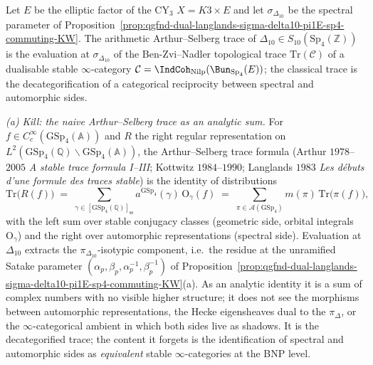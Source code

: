 \begin{proposition}
\label{prop:qgfnd-categorified-arthur-selberg-BZN-topological-trace-delta10}
Let $E$ be the elliptic factor of the CY$_3$ $X=K3\times E$ and let
$\sigma_{\Delta_{10}}$ be the spectral parameter of
Proposition~\ref{prop:qgfnd-dual-langlands-sigma-delta10-pi1E-sp4-commuting-KW}.
The arithmetic Arthur--Selberg trace of $\Delta_{10}\in S_{10}(\mathrm{Sp}_4(\mathbb Z))$
is the evaluation at $\sigma_{\Delta_{10}}$ of the Ben-Zvi--Nadler
topological trace $\mathrm{Tr}(\mathcal C)$ of a dualisable stable
$\infty$-category $\mathcal C=\IndCoh_{\mathrm{Nilp}}(\Bun_{\mathrm{Sp}_4}(E))$;
the classical trace is the decategorification of a categorical
reciprocity between spectral and automorphic sides.

\emph{(a) Kill: the naive Arthur--Selberg trace as an analytic sum.}
For $f\in C_c^{\infty}(\mathrm{GSp}_4(\mathbb A))$ and
$R$ the right regular representation on
$L^2(\mathrm{GSp}_4(\mathbb Q)\backslash\mathrm{GSp}_4(\mathbb A))$,
the Arthur--Selberg trace formula (Arthur $1978$--$2005$
\emph{A stable trace formula I--III}; Kottwitz $1984$--$1990$; Langlands
$1983$ \emph{Les d\'ebuts d'une formule des traces stable}) is the
identity of distributions
\[
 \mathrm{Tr}\bigl(R(f)\bigr)
 \;=\;\sum_{\gamma\in[\mathrm{GSp}_4(\mathbb Q)]_{\mathrm{ss}}}
 a^{\mathrm{GSp}_4}(\gamma)\,\mathrm{O}_\gamma(f)
 \;=\;\sum_{\pi\in\mathcal A(\mathrm{GSp}_4)}
 m(\pi)\,\mathrm{Tr}\bigl(\pi(f)\bigr),
\]
with the left sum over stable conjugacy classes (geometric side,
orbital integrals $\mathrm{O}_\gamma$) and the right over automorphic
representations (spectral side). Evaluation at $\Delta_{10}$ extracts
the $\pi_{\Delta_{10}}$-isotypic component, i.e.\ the residue at the
unramified Satake parameter $(\alpha_p,\beta_p,\alpha_p^{-1},\beta_p^{-1})$
of Proposition~\ref{prop:qgfnd-dual-langlands-sigma-delta10-pi1E-sp4-commuting-KW}(a).
As an analytic identity it is a sum of complex numbers with no visible
higher structure; it does not see the morphisms between automorphic
representations, the Hecke eigensheaves dual to the $\pi_\Delta$, or
the $\infty$-categorical ambient in which both sides live as shadows.
It is the decategorified trace; the content it forgets is the
identification of spectral and automorphic sides as \emph{equivalent}
stable $\infty$-categories at the BNP level.


\end{proposition}

